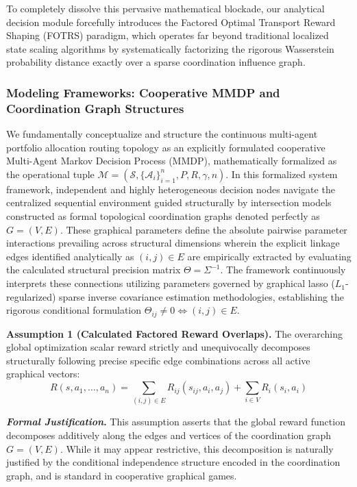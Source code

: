 \documentclass[12pt,a4paper,oneside]{report}
\theoremstyle{definition}
\theoremstyle{remark}
\begin{document}
To completely dissolve this pervasive mathematical blockade, our analytical decision module forcefully introduces the Factored Optimal Transport Reward Shaping (FOTRS) paradigm, which operates far beyond traditional localized state scaling algorithms by systematically factorizing the rigorous Wasserstein probability distance exactly over a sparse coordination influence graph.

\subsubsection{Modeling Frameworks: Cooperative MMDP and Coordination Graph Structures}
We fundamentally conceptualize and structure the continuous multi-agent portfolio allocation routing topology as an explicitly formulated cooperative Multi-Agent Markov Decision Process (MMDP), mathematically formalized as the operational tuple $\mathcal{M} = (\mathcal{S}, \{\mathcal{A}_i\}_{i=1}^n, P, R, \gamma, n)$. In this formalized system framework, independent and highly heterogeneous decision nodes navigate the centralized sequential environment guided structurally by intersection models constructed as formal topological coordination graphs denoted perfectly as $G = (V, E)$. These graphical parameters define the absolute pairwise parameter interactions prevailing across structural dimensions wherein the explicit linkage edges identified analytically as $(i, j) \in E$ are empirically extracted by evaluating the calculated structural precision matrix $\Theta = \Sigma^{-1}$. The framework continuously interprets these connections utilizing parameters governed by graphical lasso ($L_1$-regularized) sparse inverse covariance estimation methodologies, establishing the rigorous conditional formulation $\Theta_{ij} \neq 0 \iff (i, j) \in E$.

\textbf{Assumption 1 (Calculated Factored Reward Overlaps).} The overarching global optimization scalar reward strictly and unequivocally decomposes structurally following precise specific edge combinations across all active graphical vectors:
\begin{equation} \label{eq:factored_reward}
R(s, a_1, \dots, a_n) = \sum_{(i,j) \in E} R_{ij}(s_{ij}, a_i, a_j) + \sum_{i \in V} R_i(s_i, a_i)
\end{equation}

\medskip
\noindent\textbf{\textit{Formal Justification}.}
This assumption asserts that the global reward function decomposes additively along the edges and vertices of the coordination graph $G = (V, E)$. While it may appear restrictive, this decomposition is naturally justified by the conditional independence structure encoded in the coordination graph, and is standard in cooperative graphical games.
\end{document}
